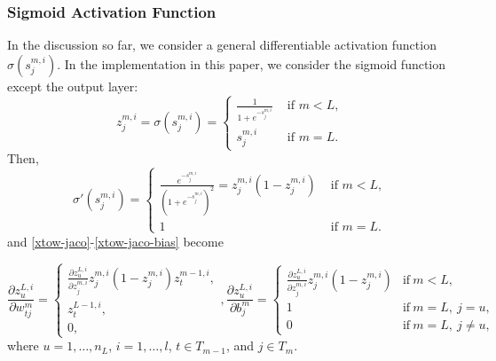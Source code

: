 \documentclass[12pt]{article}
\begin{document}
\subsubsection{Sigmoid Activation Function}
\label{subsubsec:sigmoid}
In the discussion so far, we consider a general differentiable activation function $\sigma(s^{m,i}_j)$. In the implementation in this paper,
we consider the sigmoid function except the output layer:
\begin{equation}
\label{this-paper-activation}
z^{m,i}_j = \sigma(s^{m,i}_j) = \begin{cases}
\frac{1}{1+e^{-s^{m,i}_j}} & \text{ if } m < L,\\
s^{m,i}_j & \text{ if } m = L.
\end{cases}
\end{equation}
Then,
\begin{equation*}
\sigma'(s^{m,i}_j) = \begin{cases}
\frac{e^{-s^{m,i}_j}}{\left(1+e^{-s^{m,i}_j}\right)^2} = z^{m,i}_j (1-z^{m,i}_j) & \text{ if } m < L,\\
1 & \text{ if } m = L.
\end{cases}
\end{equation*}
and \eqref{xtow-jaco}-\eqref{xtow-jaco-bias} become

\begin{equation*}
\frac{\partial z^{L,i}_u}{\partial w^m_{tj}} = 
\begin{cases} 
\frac{\partial z^{L,i}_u}{\partial z^{m,i}_j} z^{m,i}_j (1-z^{m,i}_j) z^{m-1,i}_t,\\
z^{L-1,i}_t,\\
0 ,
\end{cases}\!,
\frac{\partial z^{L,i}_u}{\partial b^m_{j}} = 
\begin{cases}
\frac{\partial z^{L,i}_u}{\partial z^{m,i}_j} z^{m,i}_j (1 - z^{m,i}_j) &\text{if}\ m < L,\\
1 &\text{if}\ m=L,\ j = u,\\
0 &\text{if}\ m=L,\ j \neq u,
\end{cases}
\end{equation*}
where $u = 1,\ldots,n_L$, $i=1,\ldots,l$, $t \in T_{m-1}$, and $j \in T_m$. 
\end{document}
